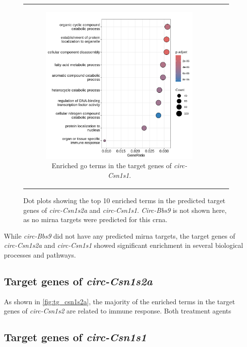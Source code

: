 \begin{figure}[H]
\begin{tabular}{ccc}
\begin{subfigure}{0.5\textwidth}
            \includegraphics[width=\linewidth]{chapters/4_results_and_discussion/figures/dea/deseq2/letrozole/chr5:87817372-87821139_targets.txt.png}
            \caption{Enriched \gls{go} terms in the target
                genes of \textit{circ-Csn1s1}.
            }
            \label{fig:tg_csn1s1}
        \end{subfigure}
    \end{tabular}
    \caption{Dot plots showing the top 10 enriched terms in the predicted
        target genes of
        \textit{circ-Csn1s2a} and \textit{circ-Csn1s1}.
        \textit{Circ-Bbs9} is not shown here, as no \gls{mirna} targets were
        predicted for this \gls{crna}.
    }
    \label{fig:target_genes}
\end{figure}

While \textit{circ-Bbs9} did not have any predicted \gls{mirna} targets, the
target genes of \textit{circ-Csn1s2a} and \textit{circ-Csn1s1} showed
significant enrichment in several biological processes and pathways.

\subsection{Target genes of \textit{circ-Csn1s2a}}

As shown in \cref{fig:tg_csn1s2a}, the majority of the enriched terms in the
target genes of \textit{circ-Csn1s2} are related to immune response.
Both treatment agents

\subsection{Target genes of \textit{circ-Csn1s1}}

